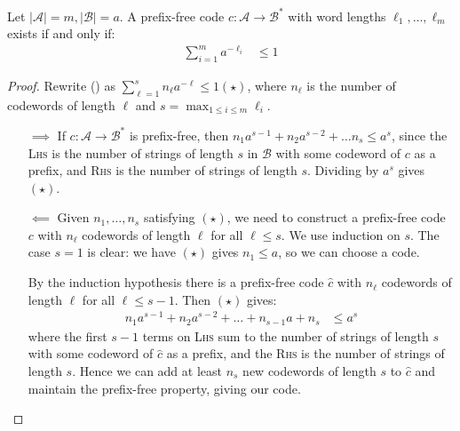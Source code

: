 \documentclass[10pt,a4paper]{article}
\begin{document}
\begin{theorem}
Let $|\mathscr{A}| = m, |\mathscr{B}| = a$. A prefix-free code $c:\mathscr{A} \to \mathscr{B}^{\ast}$ with word lengths $\ell_1, \ldots, \ell_m$ exists if and only if:
\begin{align*}
\sum_{i=1}^{m} a^{-\ell_i} &\leq 1 \tag{\ast}
\end{align*}
\end{theorem}
\begin{proof}
Rewrite (\ast) as $\sum_{\ell=1}^s n_{\ell}a^{-\ell} \leq 1 (\star)$, where $n_{\ell}$ is the number of codewords of length $\ell$ and $s = \max_{1 \leq i \leq m} \ell_i$.

\begin{itemize}
\item[$\implies$] If $c:\mathscr{A} \to \mathscr{B}^{\ast}$ is prefix-free, then $n_1 a^{s-1} + n_2 a^{s-2} + \ldots n_s \leq a^s$, since the \textsc{Lhs} is the number of strings of length $s$ in $\mathscr{B}$ with some codeword of $c$ as a prefix, and \textsc{Rhs} is the number of strings of length $s$. Dividing by $a^{s}$ gives $(\star)$.

\item[$\impliedby$] Given $n_1, \ldots, n_s$ satisfying $(\star)$, we need to construct a prefix-free code $c$ with $n_\ell$ codewords of length $\ell$ for all $\ell \leq s$. We use induction on $s$. The case $s=1$ is clear: we have $(\star)$ gives $n_1 \leq a$, so we can choose a code.

By the induction hypothesis there is a prefix-free code $\hat{c}$ with $n_{\ell}$ codewords of length $\ell$ for all $\ell \leq s-1$. Then $(\star)$ gives:
\begin{align*}
n_1 a^{s-1} + n_2 a^{s-2} + \ldots + n_{s-1}a + n_s &\leq a^s
\end{align*}
where the first $s-1$ terms on \textsc{Lhs} sum to the number of strings of length $s$ with some codeword of $\hat{c}$ as a prefix, and the \textsc{Rhs} is the number of strings of length $s$. Hence we can add at least $n_s$ new codewords of length $s$ to $\hat{c}$ and maintain the prefix-free property, giving our code.
\end{itemize}
\end{proof}
\end{document}
